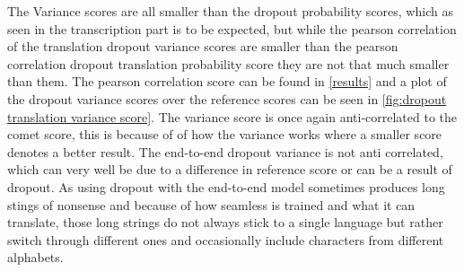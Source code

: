 The Variance scores are all smaller than the dropout probability scores, which as seen in the transcription part is to be expected, but while the pearson correlation of the translation dropout variance scores are smaller than the pearson correlation dropout translation probability score they are not that much smaller than them. The pearson correlation score can be found in \autoref{results} and a plot of the dropout variance scores over the reference scores can be seen in \autoref{fig:dropout translation variance score}.
The variance score is once again anti-correlated to the comet score, this is because of of how the variance works where a smaller score denotes a better result. 
The end-to-end dropout variance is not anti correlated, which can very well be due to a difference in reference score or can be a result of dropout.
As using dropout with the end-to-end model sometimes produces long stings of nonsense and because of how seamless is trained and what it can translate, those long strings do not always stick to a single language but rather switch through different ones and occasionally include characters from different alphabets. 
